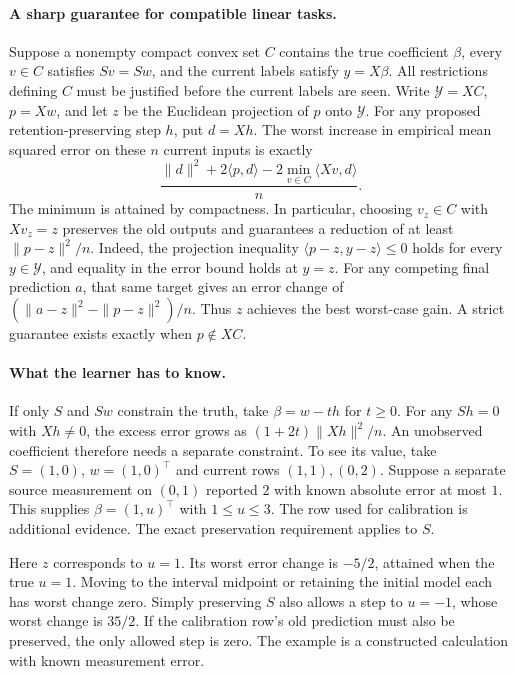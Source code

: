 \documentclass[11pt,a4paper]{article}
\begin{document}
\paragraph{A sharp guarantee for compatible linear tasks.}
Suppose a nonempty compact convex set $C$ contains the true coefficient
$\beta$, every $v\in C$ satisfies $Sv=Sw$, and the current labels satisfy
$y=X\beta$. All restrictions defining $C$ must be justified before the
current labels are seen. Write $\mathcal Y=XC$, $p=Xw$, and let $z$ be
the Euclidean projection of $p$ onto $\mathcal Y$. For any proposed
retention-preserving step $h$, put $d=Xh$. The worst increase in empirical
mean squared error on these $n$ current inputs is exactly
\[
 \frac{\|d\|^2+2\langle p,d\rangle
             -2\min_{v\in C}\langle Xv,d\rangle}{n}.
\]
The minimum is attained by compactness. In particular, choosing $v_z\in C$
with $Xv_z=z$ preserves the old outputs and guarantees a reduction of at
least $\|p-z\|^2/n$. Indeed, the projection inequality
$\langle p-z,y-z\rangle\leq0$ holds for every $y\in\mathcal Y$, and
equality in the error bound holds at $y=z$. For any competing final
prediction $a$, that same target gives an error change of
$(\|a-z\|^2-\|p-z\|^2)/n$. Thus $z$ achieves the best worst-case gain.
A strict guarantee exists exactly when $p\notin XC$.

\paragraph{What the learner has to know.}
If only $S$ and $Sw$ constrain the truth, take $\beta=w-th$ for $t\ge0$.
For any $Sh=0$ with $Xh\ne0$, the excess error grows as
$(1+2t)\|Xh\|^2/n$. An unobserved coefficient therefore needs a separate
constraint. To see its value, take $S=(1,0)$, $w=(1,0)^\top$ and current
rows $(1,1),(0,2)$. Suppose a separate source measurement on $(0,1)$
reported $2$ with known absolute error at most $1$. This supplies
$\beta=(1,u)^\top$ with $1\le u\le3$. The row used for calibration is
additional evidence. The exact preservation requirement applies to $S$.

Here $z$ corresponds to $u=1$. Its worst error change is $-5/2$, attained
when the true $u=1$. Moving to the interval midpoint or retaining the
initial model each has worst change zero. Simply preserving $S$ also
allows a step to $u=-1$, whose worst change is $35/2$. If the calibration
row's old prediction must also be preserved, the only allowed step is zero.
The example is a constructed calculation with known measurement error.
\end{document}
